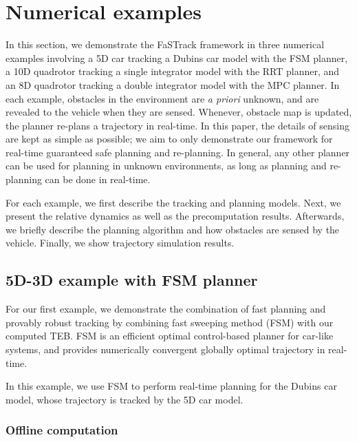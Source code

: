 \section{Numerical examples} \label{sec:results}

In this section, we demonstrate the FaSTrack framework in three numerical examples involving a 5D car tracking a Dubins car model with the FSM planner, a 10D quadrotor tracking a single integrator model with the RRT planner, and an 8D quadrotor tracking a double integrator model with the MPC planner.
In each example, obstacles in the environment are \textit{a priori} unknown, and are revealed to the vehicle when they are sensed.
Whenever, obstacle map is updated, the planner re-plans a trajectory in real-time.
In this paper, the details of sensing are kept as simple as possible; we aim to only demonstrate our framework for real-time guaranteed safe planning and re-planning.
In general, any other planner can be used for planning in unknown environments, as long as planning and re-planning can be done in real-time.

For each example, we first describe the tracking and planning models. 
Next, we present the relative dynamics as well as the precomputation results. 
Afterwards, we briefly describe the planning algorithm and how obstacles are sensed by the vehicle. 
Finally, we show trajectory simulation results.

\subsection{5D-3D example with FSM planner \label{sec:reach_planner}}

For our first example, we demonstrate the combination of fast planning and provably robust tracking by combining fast sweeping method (FSM) \cite{Takei2013} with our computed TEB. 
FSM is an efficient optimal control-based planner for car-like systems, and provides numerically convergent globally optimal trajectory in real-time.

In this example, we use FSM to perform real-time planning for the Dubins car model, whose trajectory is tracked by the 5D car model.

\subsubsection{Offline computation}


